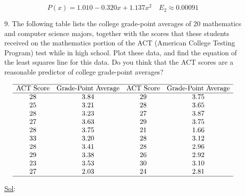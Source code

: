 \begin{enumerate}
    \[
      \boxed{P(x) = 1.010 - 0.320x + 1.137x^2} \quad \boxed{E_2 \approx 0.00091}
    \]


  \item[9.] The following table lists the college grade-point
    averages of 20 mathematics and computer science majors, together
    with the scores that these students received on the mathematics
    portion of the ACT (American College Testing Program) test while
    in high school. Plot these data, and find the equation of the
    least squares line for this data. Do you think that the ACT
    scores are a reasonable predictor of college grade-point averages?

    \[
      \begin{array}{cccc}
        \hline
        \textrm{ACT Score} & \textrm{Grade-Point Average} &
        \textrm{ACT Score} & \textrm{Grade-Point Average} \\
        \hline
        28 & 3.84 & 29 & 3.75 \\
        25 & 3.21 & 28 & 3.65 \\
        28 & 3.23 & 27 & 3.87 \\
        27 & 3.63 & 29 & 3.75 \\
        28 & 3.75 & 21 & 1.66 \\
        33 & 3.20 & 28 & 3.12 \\
        28 & 3.41 & 28 & 2.96 \\
        29 & 3.38 & 26 & 2.92 \\
        23 & 3.53 & 30 & 3.10 \\
        27 & 2.03 & 24 & 2.81 \\
        \hline
      \end{array}
    \]

    \underline{Sol}:\\


\end{enumerate}
